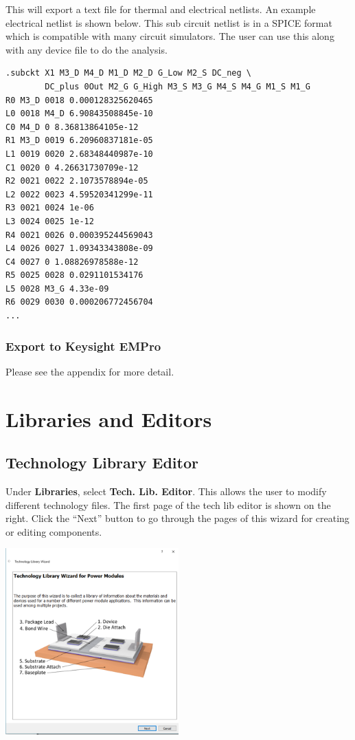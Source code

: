 \documentclass[11pt]{article}
\begin{document}
This will export a text file for thermal and electrical netlists. An example electrical netlist is shown below. This sub circuit netlist is in a SPICE format which is compatible with many circuit simulators. The user can use this along with any device file to do the analysis.

\begin{verbatim}
.subckt X1 M3_D M4_D M1_D M2_D G_Low M2_S DC_neg \
        DC_plus 0Out M2_G G_High M3_S M3_G M4_S M4_G M1_S M1_G
R0 M3_D 0018 0.000128325620465 
L0 0018 M4_D 6.90843508845e-10 
C0 M4_D 0 8.36813864105e-12 
R1 M3_D 0019 6.20960837181e-05 
L1 0019 0020 2.68348440987e-10 
C1 0020 0 4.26631730709e-12 
R2 0021 0022 2.1073578894e-05 
L2 0022 0023 4.59520341299e-11 
R3 0021 0024 1e-06 
L3 0024 0025 1e-12 
R4 0021 0026 0.000395244569043 
L4 0026 0027 1.09343343808e-09 
C4 0027 0 1.08826978588e-12 
R5 0025 0028 0.0291101534176 
L5 0028 M3_G 4.33e-09 
R6 0029 0030 0.000206772456704 
...
\end{verbatim}

\pagebreak

\subsubsection{Export to Keysight EMPro}
\label{sec-2-8-4}

Please see the appendix for more detail.

\section{Libraries and Editors}
\label{sec-3}

\subsection{Technology Library Editor}
\label{sec-3-1}

Under \textbf{Libraries}, select \textbf{Tech. Lib. Editor}. This allows the user to modify different technology files. The first page of the tech lib editor is shown on the right. Click the “Next” button to go through the pages of this wizard for creating or editing components.

\begin{center}
\includegraphics[width=0.5\textwidth]{./figs/32_TL1.png}
\end{center}
\end{document}
